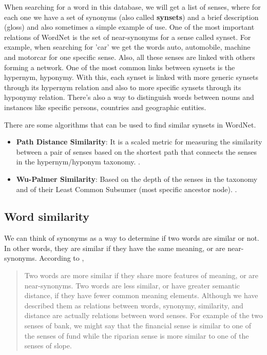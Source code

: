When searching for a word in this database, we will get a list of senses, where for each one we have a set of synonyms (also called \textbf{synsets}) and a brief description (gloss) and also sometimes a simple example of use. One of the most important relations of WordNet is the set of near-synonyms for a sense called synset. For example, when searching for 'car' we get the words auto, automobile, machine and motorcar for one specific sense. Also, all these senses are linked with others forming a network. One of the most common links between synsets is the hypernym, hyponymy. With this, each synset is linked with more generic synsets through its hypernym relation and also to more specific synsets through its hyponymy relation. There's also a way to distinguish words between nouns and instances like specific persons, countries and geographic entities.

There are some algorithms that can be used to find similar synsets in WordNet.

\begin{itemize}
    \item \textbf{Path Distance Similarity}: It is a scaled metric for measuring the similarity between a pair of senses based on the shortest path that connects the senses in the hypernym/hyponym taxonomy. \cite{meng2014measuring}.
    \item \textbf{Wu-Palmer Similarity}: Based on the depth of the senses in the taxonomy and of their Least Common Subsumer (most specific ancestor node). \cite{meng2014measuring}.
\end{itemize}



\subsection{Word similarity}

We can think of synonyms as a way to determine if two words are similar or not. In other words, they are similar if they have the same meaning, or are near-synonyms. According to ,

\begin{quote}
Two words are more similar if they share more features of meaning, or are near-synonyms. Two words are less similar, or have greater semantic distance, if they have fewer common meaning elements. Although we have described them as relations between words, synonymy, similarity, and distance are actually relations between word senses. For example of the two senses of bank, we might say that the financial sense is similar to one of the senses of fund while the riparian sense is more similar to one of the senses of slope.
\end{quote}

